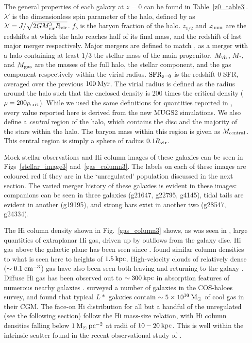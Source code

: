 The general properties of each galaxy at $z=0$ can be found in
Table~\ref{z0_table3}.  $\lambda'$ is the dimensionless spin parameter of the
halo, defined by \citet{Bullock2001} as $\lambda'=J/\sqrt{2GM_{\rm vir}^3R_{\rm vir}}$.
$f_b$ is the baryon fraction of the halo.  $z_{1/2}$ and $z_{\rm lmm}$ are the
redshifts at which the halo reaches half of its final mass, and the redshift of
last major merger respectively.  Major mergers are defined to match
\citet{Stinson2010}, as a merger with a halo containing at least $1/3$ the
stellar mass of the main progenitor.  $M_{\rm vir}$, $M_*$, and $M_{\rm gas}$ are the
masses of the full halo, the stellar component, and the gas component
respectively within the virial radius.  $\rm{SFR_{\rm z=0}}$ is the redshift 0 
SFR, averaged over the previous $100\>{\rm Myr}$.  The virial radius
is defined as the radius around the halo such that the enclosed density is 200
times the critical density ($\rho=200\rho_{\rm crit}$).  While we used the same
definitions for quantities reported in \citet{Stinson2010}, every value reported
here is derived from the new MUGS2 simulations.  We also define a {\it central}
region of the halo, which contains the disc and the majority of the stars within
the halo.  The baryon mass within this region is given as $M_{\rm central}$.  This
central region is simply a sphere of radius $0.1R_{\rm vir}$.

Mock stellar observations and {\sc Hi} column images of these galaxies can be
seen in Figs~\ref{stellar_image3} and~\ref{gas_column3}.  The labels on each of
these images are coloured red if they are in the `unregulated' population
discussed in the next section.  The varied merger history of these galaxies is
evident in these images: companions can be seen in three galaxies (g21647,
g22795, g4145), tidal tails are evident in another  (g19195), and strong bars
exist in another two (g28547, g24334).  

The {\sc Hi} column density shown in Fig.~\ref{gas_column3} shows, as was seen in
\citet{Keller2015}, large quantities of extraplanar {\sc Hi} gas, driven up by
outflows from the galaxy disc.  {\sc Hi} gas above the galactic plane has been seen
since \citet{Muller1963}.  \citet{Lockman1984} found similar column densities to
what is seen here to heights of $1.5\>{\rm kpc}$.  High-velocity clouds of relatively
dense ($\sim0.1\; \rm{cm^{-3}}$) gas have also been seen both leaving and
returning to the galaxy \citep{Wakker1997}.  Diffuse {\sc Hi} gas has been observed
out to $\sim300\>{\rm kpc}$ in absorption features of numerous nearby galaxies
\citep{Wakker2009,Prochaska2011}.  \citet{Werk2014} surveyed a number of
galaxies in the COS-haloes survey, and found that typical $L*$ galaxies contain
$\sim5 \times10^{10}\>{\rm M_{\odot}}$ of cool gas in their CGM.  The face-on {\sc Hi}
distribution for all but a handful of the unregulated (see the following
section) follow the \citet{Broeils1997} {\sc Hi} mass-size relation, with {\sc Hi} column
densities falling below $1\>{\rm M_{\odot}}\>{\rm pc}^{-2}$ at radii of $10-20\>{\rm kpc}$.  This is well
within the intrinsic scatter found in the recent observational study of
\citet{Wang2016}.


